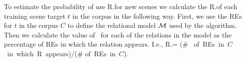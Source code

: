 To estimate the probability of use R.\puse for new scenes we calculate the R.\puse of each training scene target $t$ in the corpus in the following way.
First, we use the REs for $t$ in the corpus $C$ to define the relational model $\mathcal{M}$
used by the algorithm.  
Then we calculate the value of \puse\ for each of the relations in the model as the percentage of REs in which the relation appears.  I.e., 
R.\puse = (\# \mbox{ of REs in $C$ in which R appears})/(\# \mbox{of REs in $C$}).
%
%
%
%
%
%
